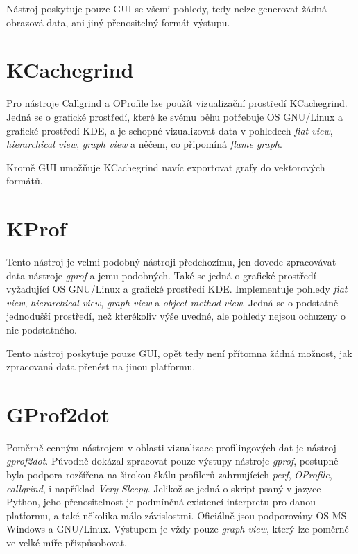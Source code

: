 \documentclass[czech,BP]{thesiskiv}
\begin{document}
Nástroj poskytuje pouze GUI se všemi pohledy, tedy nelze generovat žádná obrazová data, ani jiný přenositelný formát výstupu.

\section{KCachegrind}

Pro nástroje Callgrind a OProfile lze použít vizualizační prostředí KCachegrind. Jedná se o grafické prostředí, které ke svému běhu potřebuje OS GNU/Linux a grafické prostředí KDE, a je schopné vizualizovat data v pohledech \emph{flat view}, \emph{hierarchical view}, \emph{graph view} a něčem, co připomíná \emph{flame graph}.

Kromě GUI umožňuje KCachegrind navíc exportovat grafy do vektorových formátů.

\section{KProf}

Tento nástroj je velmi podobný nástroji předchozímu, jen dovede zpracovávat data nástroje \emph{gprof} a jemu podobných. Také se jedná o grafické prostředí vyžadující OS GNU/Linux a grafické prostředí KDE. Implementuje pohledy \emph{flat view}, \emph{hierarchical view}, \emph{graph view} a \emph{object-method view}. Jedná se o podstatně jednodušší prostředí, než kterékoliv výše uvedné, ale pohledy nejsou ochuzeny o nic podstatného.

Tento nástroj poskytuje pouze GUI, opět tedy není přítomna žádná možnost, jak zpracovaná data přenést na jinou platformu.

\section{GProf2dot}

Poměrně cenným nástrojem v oblasti vizualizace profilingových dat je nástroj \emph{gprof2dot}. Původně dokázal zpracovat pouze výstupy nástroje \emph{gprof}, postupně byla podpora rozšířena na širokou škálu profilerů zahrnujících \emph{perf}, \emph{OProfile}, \emph{callgrind}, i například \emph{Very Sleepy}. Jelikož se jedná o skript psaný v jazyce Python, jeho přenositelnost je podmíněná existencí interpretu pro danou platformu, a také několika málo závislostmi. Oficiálně jsou podporovány OS MS Windows a GNU/Linux. Výstupem je vždy pouze \emph{graph view}, který lze poměrně ve velké míře přizpůsobovat.
\end{document}
